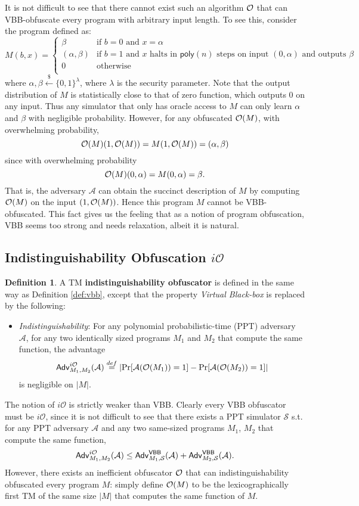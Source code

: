 \documentclass[12pt]{article}
\newcommand{\eqdef}{\stackrel{def}{=}}
\newcommand{\bits}{\{0,1\}}
\newcommand{\getsr}{\stackrel{\$}{\gets}}
\newcommand{\A}{\mathcal{A}}
\newcommand{\Sim}{\mathcal{S}}
\newcommand{\Adv}{\mathsf{Adv}}
\newcommand{\poly}{\mathsf{poly}}
\newcommand{\io}{i\mathcal{O}}
\theoremstyle{definition}
\newtheorem{definition}[theorem]{Definition}
\begin{document}
It is not difficult to see that there cannot exist such an algorithm $\mathcal{O}$ that can VBB-obfuscate every program with arbitrary input length. To see this, consider the program defined as:
$$M(b,x) = 
\begin{cases}
\beta & \textrm{if $b=0$ and $x=\alpha$} \\
(\alpha, \beta) & \textrm{if $b=1$ and $x$ halts in $\poly(n)$ steps on input $(0,\alpha)$ and outputs $\beta$} \\
0 & \textrm{otherwise} \\
\end{cases}$$
where $\alpha, \beta \getsr \bits^\lambda$, where $\lambda$ is the security parameter.
Note that the output distribution of $M$ is statistically close to that of zero function, which outputs 0 on any input. Thus any simulator that only has oracle access to $M$ can only learn $\alpha$ and $\beta$ with negligible probability. However, for any obfuscated $\mathcal{O}(M)$, with overwhelming probability,
$$\mathcal{O}(M)(1, \mathcal{O}(M)) = M(1, \mathcal{O}(M)) = (\alpha, \beta)$$
since with overwhelming probability
$$\mathcal{O}(M)(0,\alpha) = M(0,\alpha) = \beta.$$ 
That is, the adversary $\A$ can obtain the succinct description of $M$ by computing $\mathcal{O}(M)$ on the input $(1, \mathcal{O}(M))$. Hence this program $M$ cannot be VBB-obfuscated. This fact gives us the feeling that as a notion of program obfuscation, VBB seems too strong and needs relaxation, albeit it is natural.

\subsection{Indistinguishability Obfuscation $\io$}
\begin{definition}
A TM {\bf indistinguishability obfuscator} is defined in the same way as Definition \ref{def:vbb}, except that the property \emph{Virtual Black-box} is replaced by the following:
\begin{itemize}
\item \emph{Indistinguishability}: For any polynomial probabilistic-time (PPT) adversary $\A$, for any two identically sized programs $M_1$ and $M_2$ that compute the same function, the advantage 
$$\Adv_{M_1,M_2}^{\io}(\A) \eqdef \left| \Pr[\A(\bigoh(M_1)) = 1] - \Pr[\A(\bigoh(M_2)) = 1] \right|$$
is negligible on $|M|$.
\end{itemize}
\end{definition}

The notion of $\io$ is strictly weaker than VBB. Clearly every VBB obfuscator must be $\io$, since it is not difficult to see that there exists a PPT simulator $\Sim$ s.t. for any PPT adversary $\A$ and any two same-sized programs $M_1$, $M_2$ that compute the same function,
$$\Adv_{M_1,M_2}^{\io}(\A) \leq \Adv_{M_1,\Sim}^{\VBB}(\A) + \Adv_{M_2,\Sim}^{\VBB}(\A).$$
However, there exists an inefficient obfuscator $\mathcal{O}$ that can indistinguishability obfuscated every program $M$: simply define $\mathcal{O}(M)$ to be the lexicographically first TM of the same size $|M|$ that computes the same function of $M$. 
\end{document}
